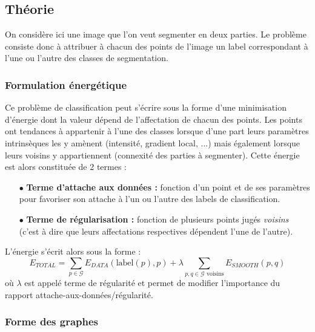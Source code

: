 \documentclass{article}
\newcommand{\lab}{\text{label}}
\begin{document}
\subsection{Théorie}

On considère ici une image que l'on veut segmenter en deux parties. Le problème consiste donc à attribuer à chacun des points de l'image un label correspondant à l'une ou l'autre des classes de segmentation.

\subsubsection{Formulation énergétique}

Ce problème de classification peut s'écrire sous la forme d'une minimisation d'énergie dont la valeur dépend de l'affectation de chacun des points. Les points ont tendances à appartenir à l'une des classes lorsque d'une part leurs paramètres intrinsèques les y amènent (intensité, gradient local, ...) mais également lorsque leurs voisins y appartiennent (connexité des parties à segmenter). Cette énergie est alors constituée de 2 termes :
\begin{itemize}
	\item[$\bullet$]\textbf{Terme d'attache aux données :} fonction d'un point et de ses paramètres pour favoriser son attache à l'un ou l'autre des labels de classification.
	\item[$\bullet$]\textbf{Terme de régularisation :} fonction de plusieurs points jugés \textit{voisins} (c'est à dire que leurs affectations respectives dépendent l'une de l'autre).
\end{itemize}
L'énergie s'écrit alors sous la forme :
\[
	E_{TOTAL} = \sum_{p \in \mathcal{G}} E_{DATA}(\lab(p), p) + \lambda \sum _{p,q \in \mathcal{G} \text{ voisins}} E_{SMOOTH}(p,q)
\]
où $\lambda$ est appelé terme de régularité et permet de modifier l'importance du rapport attache-aux-données/régularité.\\

\subsubsection{Forme des graphes}
\end{document}
